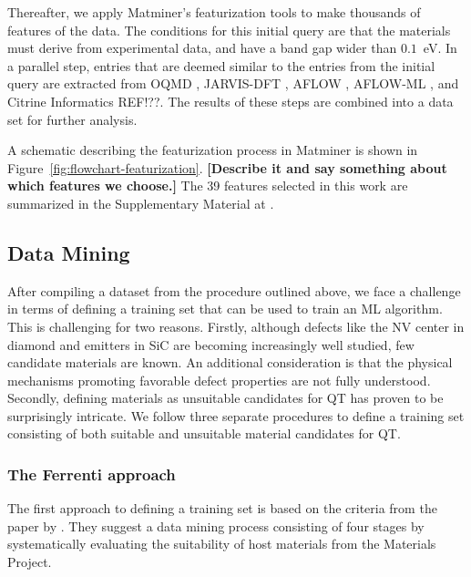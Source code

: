 \documentclass[superscriptaddress,unsortedaddress,
 amsmath,amssymb,
 aps,
]{revtex4-2}
\begin{document}
Thereafter, we apply Matminer’s \cite{Ward2018}
featurization tools to make thousands of features of the data. The conditions for this initial query are that the materials must derive from experimental data, and have a band gap wider than $0.1$~eV. In a parallel step, entries that are deemed
similar to the entries from the initial query
are extracted from 
OQMD \cite{Saal2013,Kirklin2015}, JARVIS-DFT \cite{Choudhary2020}, 
AFLOW \cite{Curtarolo2012, Curtarolo2012a, Calderon2015}, 
AFLOW-ML \cite{Isayev2017},
and
Citrine Informatics REF!??. The results of these steps are combined into
a data set for further analysis.

A schematic describing the featurization process in Matminer is shown in Figure~\ref{fig:flowchart-featurization}. 
\textbf{[Describe it and say something about which features we choose.]}  
The 39 features selected in this work are summarized in the Supplementary Material at \cite{supplementary}. 


\subsection*{Data Mining}

After compiling a dataset from the procedure outlined above, we 
face a challenge in terms of defining a training set that %
can be used to train an ML algorithm. 
This is challenging for two reasons. 
Firstly, although defects like the NV center in diamond and emitters in SiC are becoming
increasingly well studied, few candidate materials are known. An additional consideration
is that the physical mechanisms promoting favorable defect properties are not fully understood. 
Secondly, defining materials as unsuitable candidates for QT has proven to be surprisingly
intricate. 
We follow three separate procedures to define a training set consisting of both suitable and unsuitable material candidates for QT. 

\subsubsection*{The Ferrenti approach}

The first approach to defining a training set is based on the criteria
from the paper by \citeauthor{Ferrenti2020} \cite{Ferrenti2020}.
They suggest a data mining process consisting of four stages by 
systematically evaluating the suitability of host materials from
the Materials Project. 
\end{document}
